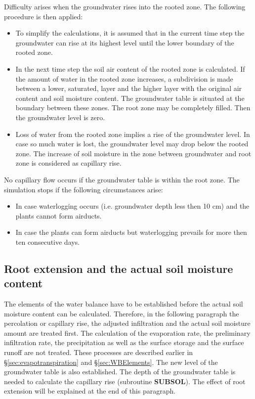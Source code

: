 Difficulty arises when the groundwater rises into the rooted zone. The following procedure is 
then applied:
\begin{itemize}
\item To simplify the calculations, it is assumed that in the current time step the
  groundwater can rise at its highest level until the lower boundary of the rooted
  zone.
\item In the next time step the soil air content of the rooted zone is calculated. If the
  amount of water in the rooted zone increases, a subdivision is made between a
  lower, saturated, layer and the higher layer with the original air content and soil
  moisture content. The groundwater table is situated at the boundary between these
  zones. The root zone may be completely filled. Then the groundwater level is
  zero.
\item Loss of water from the rooted zone implies a rise of the groundwater level. In
  case so much water is lost, the groundwater level may drop below the rooted
  zone. The increase of soil moisture in the zone between groundwater and root
  zone is considered as capillary rise.
\end{itemize}
 
No capillary flow occurs if the groundwater table is within the root zone. The simulation
stops if the following circumstances arise:
\begin{itemize}
\item In case waterlogging occurs (i.e. groundwater depth less then 10 cm) and the
  plants cannot form airducts.
\item In case the plants can form airducts but waterlogging prevails for more then ten
  consecutive days.
\end{itemize}

\subsection{Root extension and the actual soil moisture content  }

The elements of the water balance have to be established before the actual soil moisture
content can be calculated. Therefore, in the following paragraph the percolation or
capillary rise, the adjusted infiltration and the actual soil moisture amount are treated
first. The calculation of the evaporation rate, the preliminary infiltration rate, the
precipitation as well as the surface storage and the surface runoff are not treated. These
processes are described earlier in \S \ref{sec:evapotranspiration} and \S \ref{sec:WBElements}. 
The new level of the groundwater
table is also established. The depth of the groundwater table is needed to calculate the
capillary rise (subroutine {\bf SUBSOL}). The effect of root extension will be explained at the
end of this paragraph.

